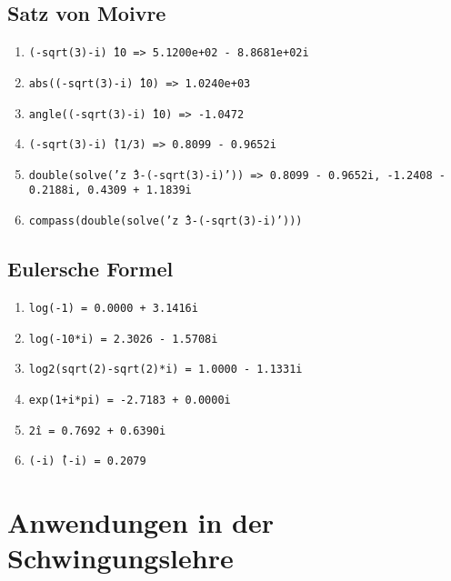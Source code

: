 \subsection{Satz von Moivre}
\begin{enumerate}[$\texttt{>}\texttt{>}$]
\item {\color{red}\texttt{(-sqrt(3)-i)\^\,10 => 5.1200e+02 - 8.8681e+02i}}
\item {\color{red}\texttt{abs((-sqrt(3)-i)\^\,10) => 1.0240e+03}}
\item {\color{red}\texttt{angle((-sqrt(3)-i)\^\,10) => -1.0472}}
\item {\color{red}\texttt{(-sqrt(3)-i)\^\,(1/3) => 0.8099 - 0.9652i}}
\item {\color{red}\texttt{double(solve('z\^\,3-(-sqrt(3)-i)')) => 0.8099 - 0.9652i, -1.2408 - 0.2188i, 0.4309 + 1.1839i}}
\item {\color{red}\texttt{compass(double(solve('z\^\,3-(-sqrt(3)-i)')))}}
\end{enumerate}
\subsection{Eulersche Formel}
\begin{enumerate}[$\texttt{>}\texttt{>}$]
\item {\color{red}\texttt{log(-1) = 0.0000 + 3.1416i}}
\item {\color{red}\texttt{log(-10*i) = 2.3026 - 1.5708i}}
\item {\color{red}\texttt{log2(sqrt(2)-sqrt(2)*i) = 1.0000 - 1.1331i}}
\item {\color{red}\texttt{exp(1+i*pi) = -2.7183 + 0.0000i}}
\item {\color{red}\texttt{2\^i = 0.7692 + 0.6390i}}
\item {\color{red}\texttt{(-i)\^\,(-i) = 0.2079}}
\end{enumerate}
\section{Anwendungen in der Schwingungslehre}
